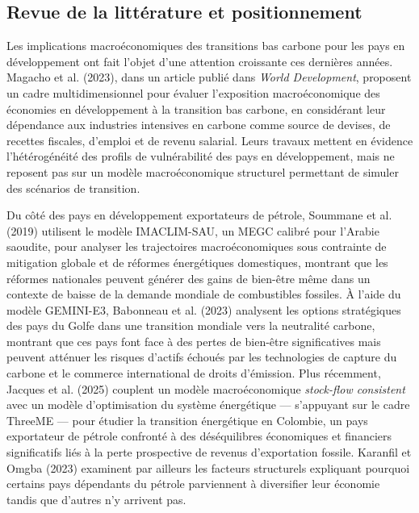 \documentclass[12pt, a4paper]{article}
\begin{document}
\subsection{Revue de la littérature et positionnement}

Les implications macroéconomiques des transitions bas carbone pour les pays en développement ont fait l'objet d'une attention croissante ces dernières années. Magacho et al. (2023), dans un article publié dans \textit{World Development}, proposent un cadre multidimensionnel pour évaluer l'exposition macroéconomique des économies en développement à la transition bas carbone, en considérant leur dépendance aux industries intensives en carbone comme source de devises, de recettes fiscales, d'emploi et de revenu salarial. Leurs travaux mettent en évidence l'hétérogénéité des profils de vulnérabilité des pays en développement, mais ne reposent pas sur un modèle macroéconomique structurel permettant de simuler des scénarios de transition.

Du côté des pays en développement exportateurs de pétrole, Soummane et al. (2019) utilisent le modèle IMACLIM-SAU, un MEGC calibré pour l'Arabie saoudite, pour analyser les trajectoires macroéconomiques sous contrainte de mitigation globale et de réformes énergétiques domestiques, montrant que les réformes nationales peuvent générer des gains de bien-être même dans un contexte de baisse de la demande mondiale de combustibles fossiles. À l'aide du modèle GEMINI-E3, Babonneau et al. (2023) analysent les options stratégiques des pays du Golfe dans une transition mondiale vers la neutralité carbone, montrant que ces pays font face à des pertes de bien-être significatives mais peuvent atténuer les risques d'actifs échoués par les technologies de capture du carbone et le commerce international de droits d'émission. Plus récemment, Jacques et al. (2025) couplent un modèle macroéconomique \textit{stock-flow consistent} avec un modèle d'optimisation du système énergétique --- s'appuyant sur le cadre ThreeME --- pour étudier la transition énergétique en Colombie, un pays exportateur de pétrole confronté à des déséquilibres économiques et financiers significatifs liés à la perte prospective de revenus d'exportation fossile. Karanfil et Omgba (2023) examinent par ailleurs les facteurs structurels expliquant pourquoi certains pays dépendants du pétrole parviennent à diversifier leur économie tandis que d'autres n'y arrivent pas.
\end{document}
